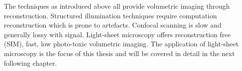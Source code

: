 The techniques as introduced above all provide volumetric imaging through reconstruction.
Structured illumination techniques require computation reconstruction which is prone to artefacts.
Confocal scanning is slow and generally lossy with signal.
Light-sheet microscopy offers reconstruction free (\gls{SIM}), fast, low photo-toxic volumetric imaging.
The application of light-sheet microscopy is the focus of this thesis and will be covered in detail in the next following chapter.

